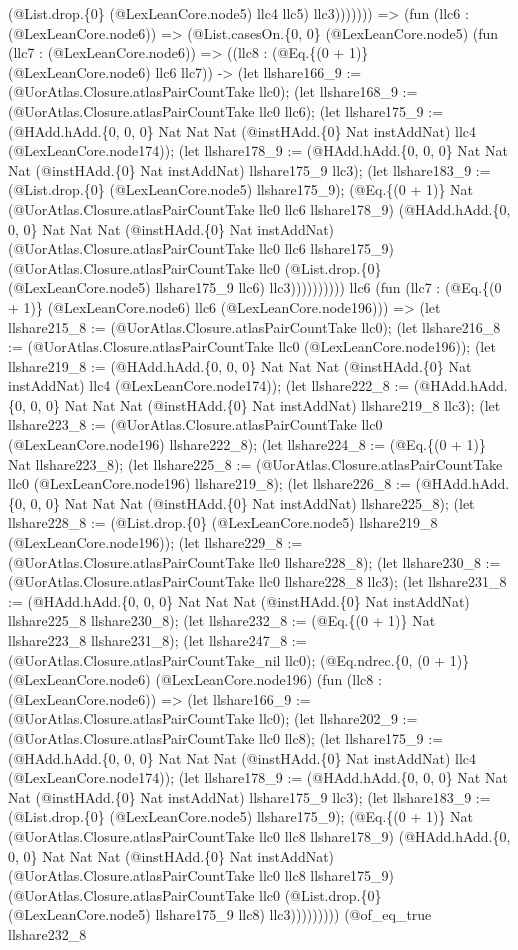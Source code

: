 \documentclass[11pt]{article}
\begin{document}
(@List.drop.\{0\} (@LexLeanCore.node5) llc4 llc5) llc3))))))) => (fun (llc6 : (@LexLeanCore.node6)) => (@List.casesOn.\{0, 0\} (@LexLeanCore.node5) (fun (llc7 : (@LexLeanCore.node6)) => ((llc8 : (@Eq.\{(0 + 1)\} (@LexLeanCore.node6) llc6 llc7)) -> (let llshare166\_9 := (@UorAtlas.Closure.atlasPairCountTake llc0); (let llshare168\_9 := (@UorAtlas.Closure.atlasPairCountTake llc0 llc6); (let llshare175\_9 := (@HAdd.hAdd.\{0, 0, 0\} Nat Nat Nat (@instHAdd.\{0\} Nat instAddNat) llc4 (@LexLeanCore.node174)); (let llshare178\_9 := (@HAdd.hAdd.\{0, 0, 0\} Nat Nat Nat (@instHAdd.\{0\} Nat instAddNat) llshare175\_9 llc3); (let llshare183\_9 := (@List.drop.\{0\} (@LexLeanCore.node5) llshare175\_9); (@Eq.\{(0 + 1)\} Nat (@UorAtlas.Closure.atlasPairCountTake llc0 llc6 llshare178\_9) (@HAdd.hAdd.\{0, 0, 0\} Nat Nat Nat (@instHAdd.\{0\} Nat instAddNat) (@UorAtlas.Closure.atlasPairCountTake llc0 llc6 llshare175\_9) (@UorAtlas.Closure.atlasPairCountTake llc0 (@List.drop.\{0\} (@LexLeanCore.node5) llshare175\_9 llc6) llc3)))))))))) llc6 (fun (llc7 : (@Eq.\{(0 + 1)\} (@LexLeanCore.node6) llc6 (@LexLeanCore.node196))) => (let llshare215\_8 := (@UorAtlas.Closure.atlasPairCountTake llc0); (let llshare216\_8 := (@UorAtlas.Closure.atlasPairCountTake llc0 (@LexLeanCore.node196)); (let llshare219\_8 := (@HAdd.hAdd.\{0, 0, 0\} Nat Nat Nat (@instHAdd.\{0\} Nat instAddNat) llc4 (@LexLeanCore.node174)); (let llshare222\_8 := (@HAdd.hAdd.\{0, 0, 0\} Nat Nat Nat (@instHAdd.\{0\} Nat instAddNat) llshare219\_8 llc3); (let llshare223\_8 := (@UorAtlas.Closure.atlasPairCountTake llc0 (@LexLeanCore.node196) llshare222\_8); (let llshare224\_8 := (@Eq.\{(0 + 1)\} Nat llshare223\_8); (let llshare225\_8 := (@UorAtlas.Closure.atlasPairCountTake llc0 (@LexLeanCore.node196) llshare219\_8); (let llshare226\_8 := (@HAdd.hAdd.\{0, 0, 0\} Nat Nat Nat (@instHAdd.\{0\} Nat instAddNat) llshare225\_8); (let llshare228\_8 := (@List.drop.\{0\} (@LexLeanCore.node5) llshare219\_8 (@LexLeanCore.node196)); (let llshare229\_8 := (@UorAtlas.Closure.atlasPairCountTake llc0 llshare228\_8); (let llshare230\_8 := (@UorAtlas.Closure.atlasPairCountTake llc0 llshare228\_8 llc3); (let llshare231\_8 := (@HAdd.hAdd.\{0, 0, 0\} Nat Nat Nat (@instHAdd.\{0\} Nat instAddNat) llshare225\_8 llshare230\_8); (let llshare232\_8 := (@Eq.\{(0 + 1)\} Nat llshare223\_8 llshare231\_8); (let llshare247\_8 := (@UorAtlas.Closure.atlasPairCountTake\_nil llc0); (@Eq.ndrec.\{0, (0 + 1)\} (@LexLeanCore.node6) (@LexLeanCore.node196) (fun (llc8 : (@LexLeanCore.node6)) => (let llshare166\_9 := (@UorAtlas.Closure.atlasPairCountTake llc0); (let llshare202\_9 := (@UorAtlas.Closure.atlasPairCountTake llc0 llc8); (let llshare175\_9 := (@HAdd.hAdd.\{0, 0, 0\} Nat Nat Nat (@instHAdd.\{0\} Nat instAddNat) llc4 (@LexLeanCore.node174)); (let llshare178\_9 := (@HAdd.hAdd.\{0, 0, 0\} Nat Nat Nat (@instHAdd.\{0\} Nat instAddNat) llshare175\_9 llc3); (let llshare183\_9 := (@List.drop.\{0\} (@LexLeanCore.node5) llshare175\_9); (@Eq.\{(0 + 1)\} Nat (@UorAtlas.Closure.atlasPairCountTake llc0 llc8 llshare178\_9) (@HAdd.hAdd.\{0, 0, 0\} Nat Nat Nat (@instHAdd.\{0\} Nat instAddNat) (@UorAtlas.Closure.atlasPairCountTake llc0 llc8 llshare175\_9) (@UorAtlas.Closure.atlasPairCountTake llc0 (@List.drop.\{0\} (@LexLeanCore.node5) llshare175\_9 llc8) llc3))))))))) (@of\_eq\_true llshare232\_8 
\end{document}
